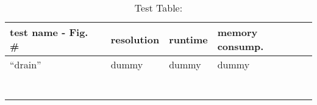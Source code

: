 \documentclass{scrartcl}
\begin{document}
\begin{table}
\centering
\caption{Test Table:}
\begin{tabularx}{\columnwidth}{X|X|X|X}
\hline\hline
test name - Fig. \# & resolution & runtime & memory consump.\\
\toprule
\enquote{drain} & dummy & dummy & dummy\\ 
\hline 
 &  &  & \\ 
\hline 
 &  &  & \\ 
\hline 
 &  &  & \\ 
\hline 
 &  &  & \\ 
\hline 
 &  &  & \\ 
\hline 
 &  &  & \\ 
\hline 
 &  &  & \\ 

\hline 
\end{tabularx}
   \vskip 1pt
\end{table} 
\end{document}
